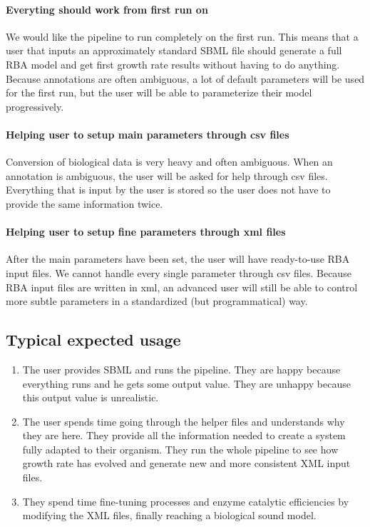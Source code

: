 \documentclass[12pt]{scrartcl}
\theoremstyle{definition}
\theoremstyle{remark}
\numberwithin{equation}{section}
\begin{document}
\paragraph{Everyting should work from first run on} We would like the pipeline to run completely on the first run. This means that a user that inputs an approximately standard SBML file should generate a full RBA model and get first growth rate results without having to do anything. Because annotations are often ambiguous, a lot of default parameters will be used for the first run, but the user will be able to parameterize their model progressively.

\paragraph{Helping user to setup main parameters through csv files} Conversion of biological data is very heavy and often ambiguous. When an annotation is ambiguous, the user will be asked for help through csv files. Everything that is input by the user is stored so the user does not have to provide the same information twice.

\paragraph{Helping user to setup fine parameters through xml files} After the main parameters have been set, the user will have ready-to-use RBA input files. We cannot handle every single parameter through csv files. Because RBA input files are written in xml, an advanced user will still be able to control more subtle parameters in a standardized (but programmatical) way.

\subsection{Typical expected usage}
\begin{enumerate}
\item The user provides SBML and runs the pipeline. They are happy because everything runs and he gets some output value. They are unhappy because this output value is unrealistic.
\item The user spends time going through the helper files and understands why they are here. They provide all the information needed to create a system fully adapted to their organism. They run the whole pipeline to see how growth rate has evolved and generate new and more consistent XML input files.
\item They spend time fine-tuning processes and enzyme catalytic efficiencies by modifying the XML files, finally reaching a biological sound model.
\end{enumerate}

\clearpage



\appendix


%
%
\end{document}
